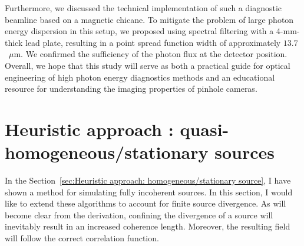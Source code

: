     Furthermore, we discussed the technical implementation of such a diagnostic beamline based on a magnetic chicane. To mitigate the problem of large photon energy dispersion in this setup, we proposed using spectral filtering with a 4-mm-thick lead plate, resulting in a point spread function width of approximately $13.7$~$\mu$m. We confirmed the sufficiency of the photon flux at the detector position. Overall, we hope that this study will serve as both a practical guide for optical engineering of high photon energy diagnostics methods and an educational resource for understanding the imaging properties of pinhole cameras.\\
    


\setcounter{mycounter}{2}
\section{Heuristic approach : quasi- homogeneous/stationary sources}
\label{Heuristic approach II: quasi- homogeneous/stationary sources}
    In the Section~\ref{sec:Heuristic approach: homogeneous/stationary source}, I have shown a method for simulating fully incoherent sources. In this section, I would like to extend these algorithms to account for finite source divergence. As will become clear from the derivation, confining the divergence of a source will inevitably result in an increased coherence length. Moreover, the resulting field will follow the correct correlation function.
    
